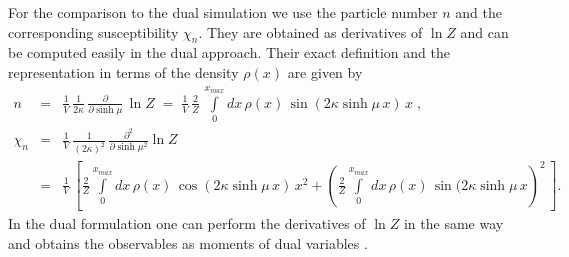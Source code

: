 \documentclass[a4paper,11pt]{article}
\begin{document}
For the comparison to the dual simulation we use the particle number $n$ and the corresponding susceptibility $\chi_n$.
They are obtained as derivatives of $\ln Z$ and can be computed easily in the dual approach. Their exact definition and
the representation in terms of the density $\rho(x)$ are given by
%
\begin{eqnarray}
n & = & \frac{1}{V} \, \frac{1}{2\kappa} \, \frac{\partial}{\partial \sinh \! \mu } \, \ln Z 
\; = \; \frac{1}{V} \, \frac{2}{Z} \, \int\limits_{0}^{x_{max}} \! \! dx \, \rho(x) \, \sin( 2 \kappa \sinh\! \mu \, x ) \, x \; ,
\label{eq:obs_n} \\
\chi_{n} & = & \frac{1}{V} \, \frac{1}{(2\kappa)^2} \, \frac{\partial^2 }{\partial \sinh \! \mu^2  } \ln Z 
\label{eq:susce_n} \\ 
& = & \frac{1}{V} \, \left[ \frac{2}{Z} \int\limits_{0}^{x_{max}} \! \! dx \, \rho(x) \, \cos(2 \kappa \sinh \! \mu \, x) \, x^2 + 
\left( \frac{2}{Z} \int\limits_{0}^{x_{max}} \! \! dx \, \rho(x) \, \sin( 2 \kappa \sinh \! \mu \, x \right)^{\!2} \, \right]  .
\nonumber
\end{eqnarray}
In the dual formulation one can perform the derivatives of $\ln Z$ in the same way and obtains the observables as 
moments of dual variables \cite{Gattringer:2011gq,Mercado:2012ue,Delgado:2012uh}.
\end{document}
